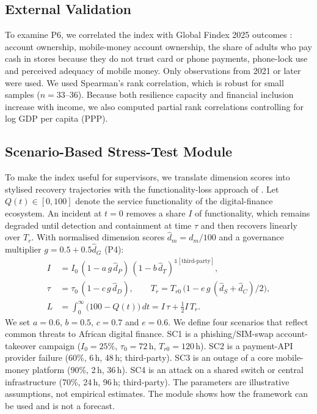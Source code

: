 \documentclass[11pt,a4paper]{article}
\begin{document}
\subsection{External Validation}\label{sec:valid_m}

To examine P6, we correlated the index with Global Findex 2025 outcomes \citep{WB2025Findex}: account ownership, mobile-money account ownership, the share of adults who pay cash in stores because they do not trust card or phone payments, phone-lock use and perceived adequacy of mobile money. Only observations from 2021 or later were used. We used Spearman's rank correlation, which is robust for small samples ($n=33$--36). Because both resilience capacity and financial inclusion increase with income, we also computed partial rank correlations controlling for log GDP per capita (PPP).

\subsection{Scenario-Based Stress-Test Module}\label{sec:scen_m}

To make the index useful for supervisors, we translate dimension scores into stylised recovery trajectories with the functionality-loss approach of \citet{Bruneau2003}. Let $Q(t)\in[0,100]$ denote the service functionality of the digital-finance ecosystem. An incident at $t=0$ removes a share $I$ of functionality, which remains degraded until detection and containment at time $\tau$ and then recovers linearly over $T_r$. With normalised dimension scores $\hat d_m=d_m/100$ and a governance multiplier $g=0.5+0.5\hat d_G$ (P4):
\begin{align}
 I &= I_0\,(1-a\,g\,\hat d_P)\,(1-b\,\hat d_T)^{\mathbb{1}[\text{third-party}]}, \label{eq:I}\\
 \tau &= \tau_0\,(1-c\,g\,\hat d_D), \qquad
 T_r = T_{r0}\,\big(1-e\,g\,(\hat d_S+\hat d_C)/2\big), \label{eq:tau}\\
 L &= \int_0^{\infty}\!\big(100-Q(t)\big)\,dt = I\,\tau + \tfrac{1}{2} I\, T_r . \label{eq:L}
\end{align}
We set $a=0.6$, $b=0.5$, $c=0.7$ and $e=0.6$. We define four scenarios that reflect common threats to African digital finance. SC1 is a phishing/SIM-swap account-takeover campaign ($I_0=25\%$, $\tau_0=72$\,h, $T_{r0}=120$\,h). SC2 is a payment-API provider failure (60\%, 6\,h, 48\,h; third-party). SC3 is an outage of a core mobile-money platform (90\%, 2\,h, 36\,h). SC4 is an attack on a shared switch or central infrastructure (70\%, 24\,h, 96\,h; third-party). The parameters are illustrative assumptions, not empirical estimates. The module shows how the framework can be used and is not a forecast.
\end{document}
